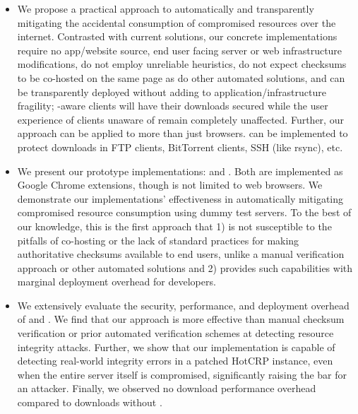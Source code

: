\begin{itemize}

  \item We propose a practical approach to automatically and transparently
  mitigating the accidental consumption of compromised resources over the
  internet. Contrasted with current solutions, our concrete implementations
  require no app/website source, end user facing server or web infrastructure
  modifications, do not employ unreliable heuristics, do not expect checksums to
  be co-hosted on the same page as do other automated solutions, and can be
  transparently deployed without adding to application/infrastructure fragility;
  \eg \SYSTEM{}-aware clients will have their downloads secured while the user
  experience of clients unaware of \SYSTEM{} remain completely unaffected.
  Further, our approach can be applied to more than just browsers. \SYSTEM{} can
  be implemented to protect downloads in FTP clients, BitTorrent clients, SSH
  (like rsync), etc.

  \item We present our prototype \SYSTEM{} implementations: \DNSSYS{} and
  \DHTSYS{}. Both are implemented as Google Chrome extensions, though \SYSTEM{}
  is not limited to web browsers. We demonstrate our implementations'
  effectiveness in automatically mitigating compromised resource consumption
  using dummy test servers. To the best of our knowledge, this is the first
  approach that 1) is not susceptible to the pitfalls of co-hosting or the lack
  of standard practices for making authoritative checksums available to end
  users, unlike a manual verification approach or other automated solutions and
  2) provides such capabilities with marginal deployment overhead for
  developers.

  \item We extensively evaluate the security, performance, and deployment
  overhead of \DNSSYS{} and \DHTSYS{}. We find that our approach is more
  effective than manual checksum verification or prior automated verification
  schemes at detecting resource integrity attacks. Further, we show that our
  \DNSSYS{} implementation is capable of detecting real-world integrity errors
  in a patched HotCRP instance, even when the entire server itself is
  compromised, significantly raising the bar for an attacker. Finally, we
  observed no download performance overhead compared to downloads without
  \DNSSYS{}.

\end{itemize}
